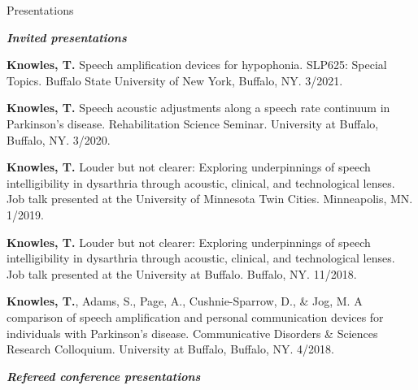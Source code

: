 \documentclass{resume} %
\begin{document}

\begin{rSection}{Presentations}

\begin{center}
	{\bf \emph{Invited presentations}}
\end{center}

\begin{etaremune}

\item {\bf Knowles, T.} Speech amplification devices for hypophonia. SLP625: Special Topics. Buffalo State University of New York, Buffalo, NY. 3/2021.

\item {\bf Knowles, T.} Speech acoustic adjustments along a speech rate continuum in Parkinson's disease. Rehabilitation Science Seminar. University at Buffalo, Buffalo, NY. 3/2020.

\item {\bf Knowles, T.} Louder but not clearer: Exploring underpinnings of speech intelligibility in dysarthria through acoustic, clinical, and technological lenses. Job talk presented at the University of Minnesota Twin Cities. Minneapolis, MN. 1/2019.

\item {\bf Knowles, T.} Louder but not clearer: Exploring underpinnings of speech intelligibility in dysarthria through acoustic, clinical, and technological lenses. Job talk presented at the University at Buffalo. Buffalo, NY. 11/2018.

\item {\bf Knowles, T.}, Adams, S., Page, A., Cushnie-Sparrow, D., \& Jog, M. A comparison of speech amplification and personal communication devices for individuals with Parkinson's disease. Communicative Disorders \& Sciences Research Colloquium. University at Buffalo, Buffalo, NY. 4/2018.

\end{etaremune}



\begin{center}
	{\bf \emph{Refereed conference presentations}}
	

\end{center}
\end{rSection}
\end{document}
